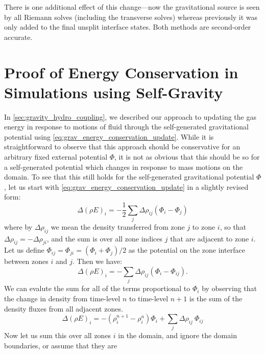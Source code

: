 \documentclass[iop,numberedappendix]{../emulateapj}
\begin{document}
There is one additional effect of this change---now the gravitational
source is seen by all Riemann solves (including the transverse solves)
whereas previously it was only added to the final unsplit interface
states.  Both methods are second-order accurate.



\section{Proof of Energy Conservation in Simulations using Self-Gravity}
\label{app:gravity}

In \autoref{sec:gravity_hydro_coupling}, we described our approach to updating the gas energy
in response to motions of fluid through the self-generated gravitational potential using 
\autoref{eq:grav_energy_conservation_update}. While it is straightforward to observe that this approach
should be conservative for an arbitrary fixed external potential $\Phi$, it is not as obvious that this
should be so for a self-generated potential which changes in response to mass motions on the domain. To
see that this still holds for the self-generated gravitational potential $\Phi$, let us start with 
\autoref{eq:grav_energy_conservation_update} in a slightly revised form:
\begin{equation}
  \Delta(\rho E)_i = -\frac{1}{2}\sum_{j} \Delta\rho_{ij}(\Phi_i - \Phi_{j}) \label{eq:grav_energy_conservation_update_revised}
\end{equation}
where by $\Delta \rho_{ij}$ we mean the density transferred from zone $j$ to zone $i$, so that
$\Delta \rho_{ij} = - \Delta \rho_{ji}$, and the sum is over all zone indices $j$ that are adjacent
to zone $i$. Let us define $\Phi_{ij} = \Phi_{ji} = (\Phi_{i} + \Phi_{j}) / 2$ as the potential on the
zone interface between zones $i$ and $j$. Then we have:
\begin{equation}
  \Delta(\rho E)_i = -\sum_{j} \Delta\rho_{ij}(\Phi_i - \Phi_{ij}).
\end{equation}
We can evalute the sum for all of the terms proportional to $\Phi_i$ by observing that the change in
density from time-level $n$ to time-level $n+1$ is the sum of the density fluxes from all adjacent zones.
\begin{equation*}
  \Delta(\rho E)_i = - (\rho_i^{n+1} - \rho_i^{n}) \Phi_i + \sum_{j}\Delta \rho_{ij} \ \Phi_{ij}
\end{equation*}
Now let us sum this over all zones $i$ in the domain, and ignore the domain boundaries, or assume that they are
\end{document}
